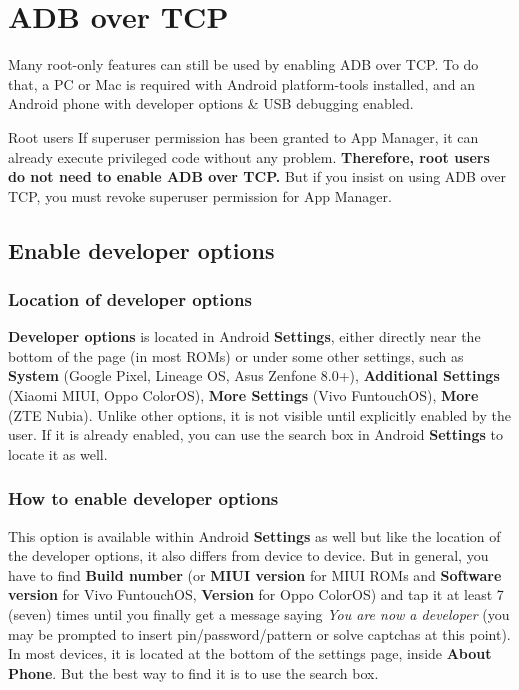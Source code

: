 \section{ADB over TCP}\label{sec:adb-over-tcp} %
Many root-only features can still be used by enabling ADB over TCP. To do that, a PC or Mac is required with Android
platform-tools installed, and an Android phone with developer options \& USB debugging enabled.

\begin{tip}{Root users}
    If superuser permission has been granted to App Manager, it can already execute privileged code
    without any problem. \textbf{Therefore, root users do not need to enable ADB over TCP.} But if
    you insist on using ADB over TCP, you must revoke superuser permission for App Manager.
\end{tip}


\subsection{Enable developer options}\label{subsec:enable-developer-options} %

\subsubsection{Location of developer options}\label{subsubsec:location-of-developer-options} %
\textbf{Developer options} is located in Android \textbf{Settings}, either directly near the bottom
of the page (in most ROMs) or under some other settings, such as \textbf{System} (Google Pixel,
Lineage OS, Asus Zenfone 8.0+), \textbf{Additional Settings} (Xiaomi MIUI, Oppo ColorOS),
\textbf{More Settings} (Vivo FuntouchOS), \textbf{More} (ZTE Nubia). Unlike other options, it is not
visible until explicitly enabled by the user. If it is already enabled, you can use the search box
in Android \textbf{Settings} to locate it as well.

\subsubsection{How to enable developer options} %
This option is available within Android \textbf{Settings} as well but like the location of the developer options, it
also differs from device to device. But in general, you have to find \textbf{Build number} (or \textbf{MIUI version} for
MIUI ROMs and \textbf{Software version} for Vivo FuntouchOS, \textbf{Version} for Oppo ColorOS) and tap it at least 7
(seven) times until you finally get a message saying \textit{You are now a developer} (you may be prompted to insert
pin/password/pattern or solve captchas at this point). In most devices, it is located at the bottom of the settings
page, inside \textbf{About Phone}. But the best way to find it is to use the search box.

